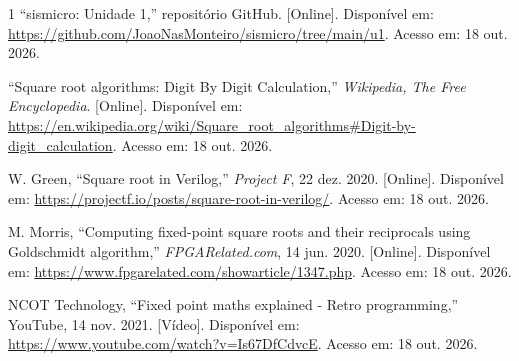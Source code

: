 \documentclass[conference]{IEEEtran}
\begin{document}
\begin{thebibliography}{1}
``sismicro: Unidade 1,'' repositório GitHub. [Online]. Disponível em: \url{https://github.com/JoaoNasMonteiro/sismicro/tree/main/u1}. Acesso em: 18 out. 2026.

``Square root algorithms: Digit By Digit Calculation,'' \emph{Wikipedia, The Free Encyclopedia}. [Online]. Disponível em: \url{https://en.wikipedia.org/wiki/Square_root_algorithms#Digit-by-digit_calculation}. Acesso em: 18 out. 2026.

W. Green, ``Square root in Verilog,'' \emph{Project F}, 22 dez. 2020. [Online]. Disponível em: \url{https://projectf.io/posts/square-root-in-verilog/}. Acesso em: 18 out. 2026.

M. Morris, ``Computing fixed-point square roots and their reciprocals using Goldschmidt algorithm,'' \emph{FPGARelated.com}, 14 jun. 2020. [Online]. Disponível em: \url{https://www.fpgarelated.com/showarticle/1347.php}. Acesso em: 18 out. 2026.

NCOT Technology, ``Fixed point maths explained - Retro programming,'' YouTube, 14 nov. 2021. [Vídeo]. Disponível em: \url{https://www.youtube.com/watch?v=Is67DfCdvcE}. Acesso em: 18 out. 2026.
\end{thebibliography}
\end{document}
